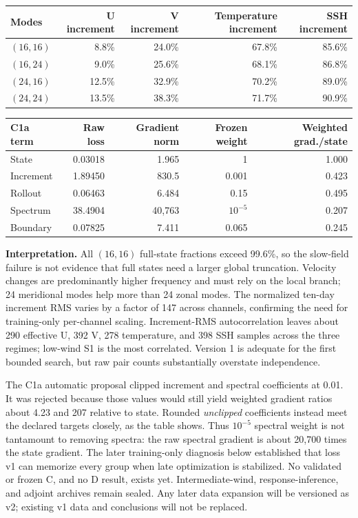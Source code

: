 \documentclass[11pt]{article}
\begin{document}
\begin{center}\small
\begin{tabular}{@{}lrrrr@{}}
\toprule
\textbf{Modes} & \textbf{U increment} & \textbf{V increment} &
\textbf{Temperature increment} & \textbf{SSH increment} \\
\midrule
\((16,16)\) & 8.8\% & 24.0\% & 67.8\% & 85.6\% \\
\((16,24)\) & 9.0\% & 25.6\% & 68.1\% & 86.8\% \\
\((24,16)\) & 12.5\% & 32.9\% & 70.2\% & 89.0\% \\
\((24,24)\) & 13.5\% & 38.3\% & 71.7\% & 90.9\% \\
\bottomrule
\end{tabular}
\end{center}

\begin{center}\small
\begin{tabular}{@{}lrrrr@{}}
\toprule
\textbf{C1a term} & \textbf{Raw loss} & \textbf{Gradient norm} &
\textbf{Frozen weight} & \textbf{Weighted grad./state} \\
\midrule
State & 0.03018 & 1.965 & 1 & 1.000 \\
Increment & 1.89450 & 830.5 & 0.001 & 0.423 \\
Rollout & 0.06463 & 6.484 & 0.15 & 0.495 \\
Spectrum & 38.4904 & 40,763 & \(10^{-5}\) & 0.207 \\
Boundary & 0.07825 & 7.411 & 0.065 & 0.245 \\
\bottomrule
\end{tabular}
\end{center}

\textbf{Interpretation.}  All \((16,16)\) full-state fractions exceed 99.6\%, so the
slow-field failure is not evidence that full states need a larger global truncation.
Velocity changes are predominantly higher frequency and must rely on the local branch;
24 meridional modes help more than 24 zonal modes.  The normalized ten-day increment
RMS varies by a factor of 147 across channels, confirming the need for training-only
per-channel scaling.  Increment-RMS autocorrelation leaves about 290 effective U,
392 V, 278 temperature, and 398 SSH samples across the three regimes; low-wind S1 is
the most correlated.  Version 1 is adequate for the first bounded search, but raw pair
counts substantially overstate independence.

The C1a automatic proposal clipped increment and spectral coefficients at 0.01.  It was
rejected because those values would still yield weighted gradient ratios about
4.23 and 207 relative to state.  Rounded \emph{unclipped} coefficients instead meet the
declared targets closely, as the table shows.  Thus \(10^{-5}\) spectral weight is not
tantamount to removing spectra: the raw spectral gradient is about 20,700 times the
state gradient.  The later training-only diagnosis below established that loss v1 can
memorize every group when late optimization is stabilized.  No validated or frozen C,
and no D result, exists yet.  Intermediate-wind, response-inference, and adjoint
archives remain sealed.  Any later data expansion will be versioned as v2; existing v1
data and conclusions will not be replaced.
\end{document}
